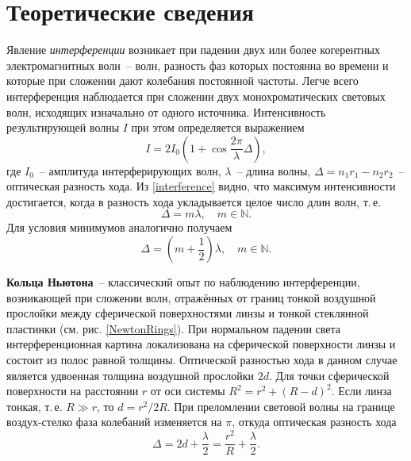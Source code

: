 \documentclass[a4paper,12pt]{article} %
\begin{document}
\section{Теоретические сведения}

Явление \textit{интерференции} возникает при падении двух или более когерентных электромагнитных волн~-- волн, разность фаз которых постоянна во времени и которые при сложении дают колебания постоянной частоты. Легче всего интерференция наблюдается при сложении двух монохроматических световых волн, исходящих изначально от одного источника. Интенсивность результирующей волны $I$ при этом определяется выражением
\begin{equation} \label{interference}
    I = 2I_0 \left( 1 + \cos \frac{2\pi}{\lambda}\Delta \right),
\end{equation}
где $I_0$~-- амплитуда интерферирующих волн, $\lambda$~-- длина волны, $\Delta = n_1r_1 - n_2r_2$~-- оптическая разность хода. Из \eqref{interference} видно, что максимум интенсивности достигается, когда в разность хода укладывается целое число длин волн, т.\,е.
\begin{equation}\label{maxInt}
    \Delta = m\lambda,\quad m \in \mathbb{N}.
\end{equation}
Для условия минимумов аналогично получаем
\begin{equation}\label{minInt}
    \Delta = (m + \frac{1}{2})\lambda,\quad m \in \mathbb{N}.
\end{equation}

\textbf{Кольца Ньютона}~-- классический опыт по наблюдению интерференции, возникающей при сложении волн, отражённых от границ тонкой воздушной прослойки между сферической поверхностями линзы и тонкой стеклянной пластинки (см. рис. \ref{NewtonRings}). При нормальном падении света интерференционная картина локализована на сферической поверхности линзы и состоит из полос равной толщины.
Оптической разностью хода в данном случае является удвоенная толщина воздушной прослойки $2d$. Для точки сферической поверхности на расстоянии $r$ от оси системы $R^2 = r^2 + (R - d)^2$. Если линза тонкая, т.\,е. $R\gg r$, то $d = r^2/2R$. При преломлении световой волны на границе воздух-стелко фаза колебаний изменяется на $\pi$, откуда оптическая разность хода
\begin{equation}\label{strokeDiff}
    \Delta = 2d + \frac{\lambda}{2} = \frac{r^2}{R} + \frac{\lambda}{2}.
\end{equation}
\end{document}
